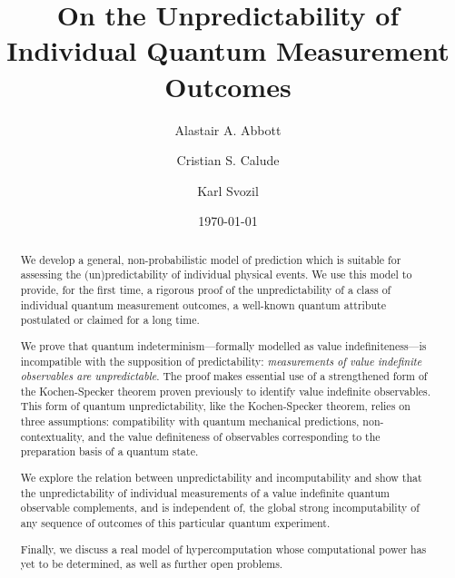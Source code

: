 \documentclass[%
 superscriptaddress,
 preprint,
 showpacs,
 showkeys,
 preprintnumbers,
 nofootinbib,
  amsmath,amssymb,
  aps,
 pra,
  longbibliography,
  floatfix,
 ]{revtex4-1}
\theoremstyle{definition}
\begin{document}
	
\title{On the Unpredictability of Individual Quantum Measurement Outcomes}
	
\author{Alastair A. Abbott}


\author{Cristian S. Calude}




\author{Karl Svozil}



\date{\today}

\begin{abstract}
We develop a general, non-probabilistic model of prediction which is suitable for assessing the (un)predictability of individual physical events.
We use this model to provide, for the first time, a rigorous proof of the unpredictability of a class of individual quantum measurement outcomes, a well-known quantum attribute postulated or claimed for a long time.

We prove that quantum indeterminism---formally modelled as value indefiniteness---is incompatible with the supposition 
of predictability: \emph{measurements of value indefinite observables are unpredictable}.
The proof makes essential use of a strengthened form of the Kochen-Specker theorem proven previously to identify value indefinite observables.
This form of  quantum unpredictability, like the Kochen-Specker theorem, relies on three assumptions: 
compatibility with quantum mechanical predictions, non-contextuality, and the value definiteness of observables corresponding to the preparation basis of a quantum state.

We explore the relation between unpredictability and incomputability and show that the unpredictability of individual measurements of a value indefinite quantum observable complements, and is independent of, the global strong incomputability of any sequence of outcomes of this particular quantum experiment.

Finally, we discuss a real model of hypercomputation whose computational power has yet to be determined, as well as further open problems.
\end{abstract}
\end{document}
